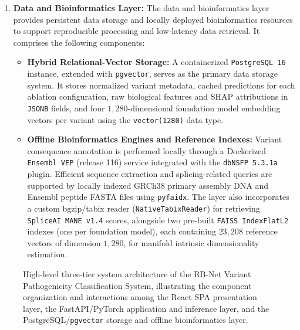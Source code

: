 \begin{enumerate}
    \item \textbf{Data and Bioinformatics Layer:}
    The data and bioinformatics layer provides persistent data storage and locally deployed bioinformatics resources to support reproducible processing and low-latency data retrieval. It comprises the following components:
    \begin{itemize}
        \item \textbf{Hybrid Relational-Vector Storage:} A containerized \texttt{PostgreSQL 16} instance, extended with \texttt{pgvector}, serves as the primary data storage system. It stores normalized variant metadata, cached predictions for each ablation configuration, raw biological features and SHAP attributions in \texttt{JSONB} fields, and four $1{,}280$-dimensional foundation model embedding vectors per variant using the \texttt{vector(1280)} data type.

        \item \textbf{Offline Bioinformatics Engines and Reference Indexes:} Variant consequence annotation is performed locally through a Dockerized \texttt{Ensembl VEP} (release 116) service integrated with the \texttt{dbNSFP 5.3.1a} plugin. Efficient sequence extraction and splicing-related queries are supported by locally indexed GRCh38 primary assembly DNA and Ensembl peptide FASTA files using \texttt{pyfaidx}. The layer also incorporates a custom bgzip/tabix reader (\texttt{NativeTabixReader}) for retrieving \texttt{SpliceAI MANE v1.4} scores, alongside two pre-built \texttt{FAISS IndexFlatL2} indexes (one per foundation model), each containing $23{,}208$ reference vectors of dimension $1{,}280$, for manifold intrinsic dimensionality estimation.
    \end{itemize}
\end{enumerate}

\begin{figure}[htbp]
    \centering
    \caption{High-level three-tier system architecture of the RB-Net Variant Pathogenicity Classification System, illustrating the component organization and interactions among the React SPA presentation layer, the FastAPI/PyTorch application and inference layer, and the PostgreSQL/\texttt{pgvector} storage and offline bioinformatics layer.}
    \label{fig:system_architecture}
\end{figure}


